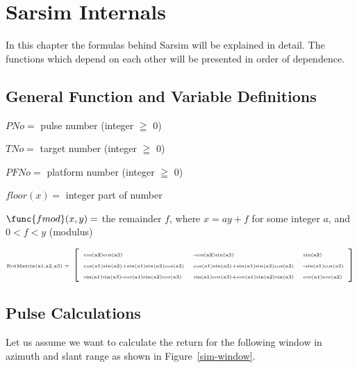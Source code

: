                       

\chapter{Sarsim Internals\label{chapter:internals}}

In this chapter the formulas behind Sarsim will be explained in detail. The
functions which depend on each other will be presented in order of
dependence.

\section{General Function and Variable Definitions}

\vspace {0.3cm}

$PNo=$ pulse number (integer $\geqq $ 0)

\vspace{0.3cm}

$TNo=$ target number (integer $\geqq $ 0)

\vspace {0.3cm}

$PFNo=$ platform number (integer $\geqq $ 0)

\vspace{0.3cm}

$floor(x)=$ integer part of number

\vspace {0.3cm}

$\func{fmod}(x,y)=$ the remainder $f$, where $x=ay+f$ for some integer $a$,
and $0<f<y$ (modulus)

\vspace {0.3cm}

\[
\text{{\tiny RotMatrix(a1,a2,a3) = }}\left[ 
\begin{array}{lll}
\text{{\tiny cos(a2)cos(a3)}} & \text{{\tiny -cos(a2)sin(a3)}} & \text{%
{\tiny sin(a2)}} \\ 
\text{{\tiny cos(a1)sin(a3)+sin(a1)sin(a2)cos(a3)}} & \text{{\tiny %
cos(a1)sin(a3)+sin(a1)sin(a2)cos(a3)}} & \text{{\tiny -sin(a1)cos(a2)}} \\ 
\text{{\tiny sin(a1)sin(a3)-cos(a1)sin(a2)cos(a3)}} & \text{{\tiny %
sin(a1)cos(a3)+cos(a1)sin(a2)sin(a3)}} & \text{{\tiny cos(a1)cos(a2)}}
\end{array}
\right] 
\]

\section{Pulse Calculations}

Let us assume we want to calculate the return for the following window in
azimuth and slant range as shown in Figure~\ref{sim-window}.

